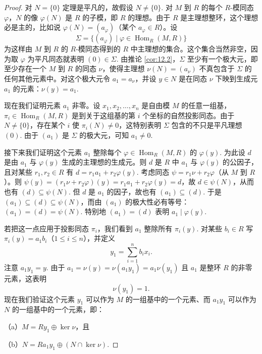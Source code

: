 \begin{proof}
对 \(N = \{0\}\) 定理是平凡的，故假设 \(N \neq \{0\}\). 对 \(M\) 到 \(R\) 的每个 \(R\)-模同态 \(\varphi\)，\(N\) 的像 \(\varphi(N)\) 是 \(R\) 的子模，即 \(R\) 的理想。由于 \(R\) 是主理想整环，这个理想必是主的，比如说 \(\varphi(N) = (a_\varphi)\)（某个 \(a_\varphi \in R\)）。设
\[
\Sigma = \{(a_\varphi) \mid \varphi \in \operatorname{Hom}_R(M, R)\}
\]
为这样由 \(M\) 到 \(R\) 的 \(R\)-模同态得到的 \(R\) 中主理想的集合。这个集合当然非空，因为取 \(\varphi\) 为平凡同态就表明 \((0) \in \Sigma\). 由推论 \ref{cor:12.2}，\(\Sigma\) 至少有一个极大元，即至少存在一个 \(M\) 到 \(R\) 的同态 \(\nu\)，使得主理想 \(\nu(N) = (a_\nu)\) 不真包含于 \(\Sigma\) 的任何其他元素中。对这个极大元令 \(a_1 = a_\nu\)，并设 \(y \in N\) 是在同态 \(\nu\) 下映到生成元 \(a_1\) 的元素：\(\nu(y) = a_1\).

现在我们证明元素 \(a_1\) 非零。设 \(x_1, x_2, \ldots, x_n\) 是自由模 \(M\) 的任意一组基，\(\pi_i \in \operatorname{Hom}_R(M, R)\) 是到关于这组基的第 \(i\) 个坐标的自然投影同态。由于 \(N \neq \{0\}\)，存在某个 \(i\) 使 \(\pi_i(N) \neq 0\)，这特别表明 \(\Sigma\) 包含的不只是平凡理想 \((0)\). 由于 \((a_1)\) 是 \(\Sigma\) 的极大元，可知 \(a_1 \neq 0\).

接下来我们证明这个元素 \(a_1\) 整除每个 \(\varphi \in \operatorname{Hom}_R(M, R)\) 的 \(\varphi(y)\). 为此设 \(d\) 是由 \(a_1\) 与 \(\varphi(y)\) 生成的主理想的生成元。则 \(d\) 是 \(R\) 中 \(a_1\) 与 \(\varphi(y)\) 的公因子，且对某些 \(r_1, r_2 \in R\) 有 \(d = r_1a_1+r_2\varphi(y)\). 考虑同态 \(\psi = r_1\nu+r_2\varphi\)（从 \(M\) 到 \(R\)）。则 \(\psi(y) = (r_1\nu+r_2\varphi)(y) = r_1a_1+r_2\varphi(y) = d\)，故 \(d \in \psi(N)\)，从而也有 \((d) \subseteq \psi(N)\). 但 \(d\) 是 \(a_1\) 的因子，故也有 \((a_1) \subseteq (d)\). 于是 \((a_1) \subseteq (d) \subseteq \psi(N)\)，而由 \((a_1)\) 的极大性必有等号：\((a_1) = (d) = \psi(N)\). 特别地 \((a_1) = (d)\) 表明 \(a_1 \mid \varphi(y)\).

若把这一点应用于投影同态 \(\pi_i\)，我们看到 \(a_1\) 整除所有 \(\pi_i(y)\). 对某些 \(b_i \in R\) 写 \(\pi_i(y) = a_1b_i\)（\(1 \leq i \leq n\)），并定义
\[
y_1 = \sum_{i=1}^n b_ix_i.
\]
注意 \(a_1y_1 = y\). 由于 \(a_1 = \nu(y) = \nu(a_1y_1) = a_1\nu(y_1)\) 且 \(a_1\) 是整环 \(R\) 的非零元素，这表明
\[
\nu(y_1) = 1.
\]
现在我们验证这个元素 \(y_1\) 可以作为 \(M\) 的一组基中的一个元素、而 \(a_1y_1\) 可以作为 \(N\) 的一组基中的一个元素，即：

（a）\(M = Ry_1 \oplus \ker\nu\)，且

（b）\(N = Ra_1y_1 \oplus (N \cap \ker\nu)\).


\end{proof}

